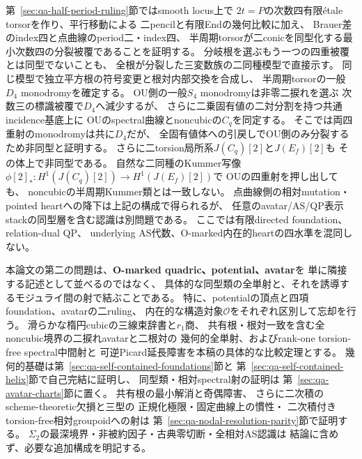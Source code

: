 \documentclass[a4paper,11pt]{ltjsarticle}
\numberwithin{equation}{section}
\theoremstyle{plain}
\theoremstyle{definition}
\theoremstyle{remark}
\newcommand{\OO}{\mathcal O}
\begin{document}
第~\ref{sec:qa-half-period-ruling}節ではsmooth locus上で
$2t=P$の次数四有限étale torsorを作り、平行移動による
二pencilと有限Endの幾何比較に加え、
Brauer差のindex四と点曲線のperiod二・index四、
半周期torsorが二conicを同型化する最小次数四の分裂被覆であることを証明する。
分岐根を選ぶもう一つの四重被覆とは同型でないことも、
全根が分裂した三変数族の二同種模型で直接示す。
同じ模型で独立平方根の符号変更と根対内部交換を合成し、
半周期torsorの一般$D_4$ monodromyを確定する。
OU側の一般$S_4$ monodromyは非零二捩れを選ぶ
次数三の標識被覆で$D_4$へ減少するが、
さらに二乗固有値の二対分割を持つ共通incidence基底上に
OUのspectral曲線とnoncubicの$C_q$を同定する。
そこでは両四重射のmonodromyは共に$D_4$だが、
全固有値体への引戻しでOU側のみ分裂するため非同型と証明する。
さらに二torsion局所系$J(C_q)[2]$と$J(E_f)[2]$も
その体上で非同型である。
自然な二同種のKummer写像
$\phi[2]_*:H^1(J(C_q)[2])\to H^1(J(E_f)[2])$で
OUの四重射を押し出しても、
noncubicの半周期Kummer類とは一致しない。
点曲線側の相対mutation・pointed heartへの降下は上記の構成で得られるが、
任意のavatar/AS/QP表示stackの同型層を含む認識は別問題である。
ここでは有限directed foundation、relation-dual QP、
underlying AS代数、O-marked内在的heartの四水準を混同しない。

本論文の第二の問題は、\textbf{O-marked quadric、potential、avatar}を
単に隣接する記述として並べるのではなく、
具体的な同型類の全単射と、それを誘導するモジュライ間の射で結ぶことである。
特に、potentialの頂点と四項foundation、avatarの二ruling、
内在的な構造対象$\OO$をそれぞれ区別して忘却を行う。
滑らかな楕円cubicの三線束辞書と$r_1$商、
共有根・根対一致を含む全noncubic境界の二捩れavatarと二根対の
幾何的全単射、およびrank-one torsion-free spectral中間射と
可逆Picard延長障害を本稿の具体的な比較定理とする。
幾何的基礎は第~\ref{sec:qa-self-contained-foundations}節と
第~\ref{sec:qa-self-contained-helix}節で自己完結に証明し、
同型類・相対spectral射の証明は
第~\ref{sec:qa-avatar-charts}節に置く。
共有根の最小解消と奇偶障害、
さらに二次積のscheme-theoretic欠損と三型の
正規化極限・固定曲線上の慣性・
二次積付きtorsion-free相対groupoidへの射は
第~\ref{sec:qa-nodal-resolution-parity}節で証明する。
$\Sigma_2$の最深境界・非被約因子・古典零切断・全相対AS認識は
結論に含めず、必要な追加構成を明記する。
\end{document}
